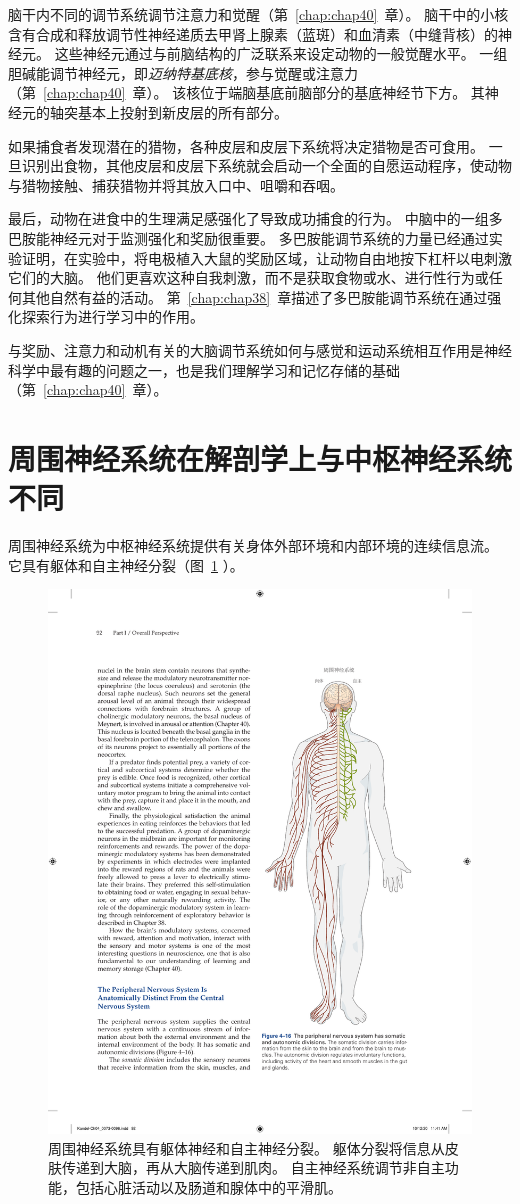 脑干内不同的调节系统调节注意力和觉醒（第~\ref{chap:chap40}~章）。 
脑干中的小核含有合成和释放调节性神经递质去甲肾上腺素（蓝斑）和血清素（中缝背核）的神经元。 
这些神经元通过与前脑结构的广泛联系来设定动物的一般觉醒水平。 
一组胆碱能调节神经元，即\textit{迈纳特基底核}，参与觉醒或注意力（第~\ref{chap:chap40}~章）。
该核位于端脑基底前脑部分的基底神经节下方。 
其神经元的轴突基本上投射到新皮层的所有部分。


如果捕食者发现潜在的猎物，各种皮层和皮层下系统将决定猎物是否可食用。 
一旦识别出食物，其他皮层和皮层下系统就会启动一个全面的自愿运动程序，使动物与猎物接触、捕获猎物并将其放入口中、咀嚼和吞咽。


最后，动物在进食中的生理满足感强化了导致成功捕食的行为。 
中脑中的一组多巴胺能神经元对于监测强化和奖励很重要。 
多巴胺能调节系统的力量已经通过实验证明，在实验中，将电极植入大鼠的奖励区域，让动物自由地按下杠杆以电刺激它们的大脑。 
他们更喜欢这种自我刺激，而不是获取食物或水、进行性行为或任何其他自然有益的活动。 
第~\ref{chap:chap38}~章描述了多巴胺能调节系统在通过强化探索行为进行学习中的作用。


与奖励、注意力和动机有关的大脑调节系统如何与感觉和运动系统相互作用是神经科学中最有趣的问题之一，也是我们理解学习和记忆存储的基础（第~\ref{chap:chap40}~章）。



\section{周围神经系统在解剖学上与中枢神经系统不同}

周围神经系统为中枢神经系统提供有关身体外部环境和内部环境的连续信息流。 
它具有躯体和自主神经分裂（图~\ref{fig:4_16} ）。


\begin{figure}[htbp]
	\centering
	\includegraphics[width=0.5\linewidth]{chap04/fig_4_16}
	\caption{周围神经系统具有躯体神经和自主神经分裂。
		躯体分裂将信息从皮肤传递到大脑，再从大脑传递到肌肉。
		自主神经系统调节非自主功能，包括心脏活动以及肠道和腺体中的平滑肌。}
	\label{fig:4_16}
\end{figure}


